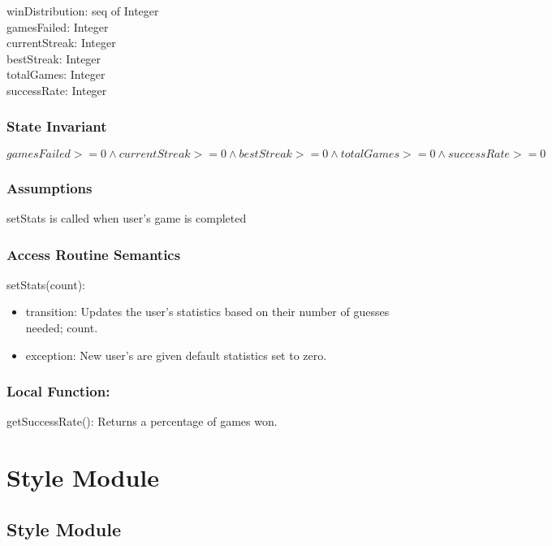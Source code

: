 \documentclass[12pt]{article}
\begin{document}
winDistribution: seq of Integer\\
gamesFailed: Integer\\
currentStreak: Integer\\
bestStreak: Integer\\
totalGames: Integer\\
successRate: Integer

\subsubsection* {State Invariant}

$gamesFailed >= 0 \wedge currentStreak >= 0 \wedge bestStreak >= 0 \wedge totalGames >= 0 \wedge successRate >= 0  $

\subsubsection* {Assumptions}

setStats is called when user's game is completed

\subsubsection* {Access Routine Semantics}

\noindent setStats(count):
\begin{itemize}
  \item transition: Updates the user's statistics based on their number of guesses needed; count.
  \item exception: New user's are given default statistics set to zero.
\end{itemize}

\subsubsection*{Local Function:}

getSuccessRate(): Returns a percentage of games won.


\newpage

\section {Style Module}

\subsection* {Style Module}
\end{document}
